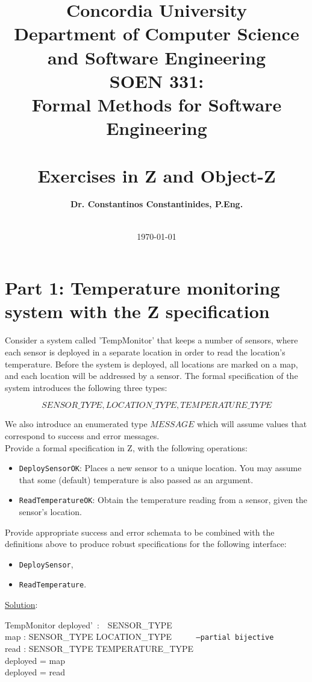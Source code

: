 \documentclass[12pt]{article}
\title{Concordia University\\
Department of Computer Science and Software Engineering\\
\textbf{SOEN 331:\\Formal Methods for Software Engineering}\\
\ \\
\textbf{Exercises in Z and Object-Z}}
\author{\textbf{Dr. Constantinos Constantinides, P.Eng.}\\
\ \\}
\date{\today}
\begin{document}
\maketitle

\newpage

\section*{Part 1:  Temperature monitoring system with the Z specification}

Consider a system called 'TempMonitor' that keeps a number of sensors, where each sensor is deployed in a separate location in order to read the location's temperature. Before the system is deployed, all locations are marked on a map, and each location will be addressed by a sensor. The formal specification of the system introduces the following three types:

\[ SENSOR\_TYPE,  LOCATION\_TYPE, TEMPERATURE\_TYPE  \]

\noindent We also introduce an enumerated type $MESSAGE$ which will assume values that correspond to success and error messages.\\

\noindent Provide a formal specification in Z, with the following operations:

\begin{itemize}
	\item \texttt{DeploySensorOK}:  Places a new sensor to a unique location. You may assume that some (default) temperature is also passed as an argument.
	\item \texttt{ReadTemperatureOK}: Obtain the temperature reading from a sensor, given the sensor's location.
\end{itemize}

\noindent Provide appropriate success and error schemata to be combined with the definitions above to produce robust specifications for the following interface:

\begin{itemize}
	\item \texttt{DeploySensor},
	\item \texttt{ReadTemperature}.
\end{itemize}

\newpage

\noindent \underline{Solution}:

\begin{schema}{TempMonitor}
deployed'~:~~SENSOR\_TYPE\\
map : SENSOR\_TYPE \nrightarrow LOCATION\_TYPE \texttt{~~~~~--partial bijective}\\
read : SENSOR\_TYPE  \nrightarrow TEMPERATURE\_TYPE\\
\where
deployed = \dom map\\
deployed = \dom read
\end{schema}
\end{document}
